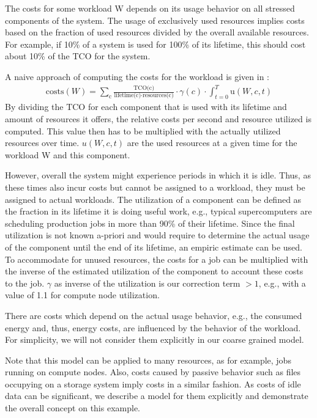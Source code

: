 \documentclass{../../template/esiwace-report}
\begin{document}
The costs for some workload W depends on its usage behavior on all stressed components of the system.
The usage of exclusively used resources implies costs based on the fraction of used resources divided by the overall available resources.
For example, if 10\% of a system is used for 100\% of its lifetime, this should cost about 10\% of the TCO for the system.


A naive approach of computing the costs for the workload is given in :
\begin{align}
\label{eq:distributeCosts}
\mbox{costs}(W) = \sum_{\mbox{c}} \frac{\mbox{TCO(c})}{\mbox{lifetime(c)} \cdot \mbox{resources(c)}} \cdot \gamma(c)  \cdot \int_{t = 0}^{T} {\mbox{u}(W,c,t)}
\end{align}
By dividing the TCO for each component that is used with its lifetime and amount of resources it offers, the relative costs per second and resource utilized is computed.
This value then has to be multiplied with the actually utilized resources over time.
$u(W,c,t)$ are the used resources at a given time for the workload W and this component.

However, overall the system might experience periods in which it is idle.
Thus, as these times also incur costs but cannot be assigned to a workload, they must be assigned to actual workloads.
The utilization of a component can be defined as the fraction in its lifetime it is doing useful work, e.g., typical supercomputers are scheduling production jobs in more than 90\% of their lifetime.
Since the final utilization is not known a-priori and would require to determine the actual usage of the component until the end of its lifetime, an empiric estimate can be used.
To accommodate for unused resources, the costs for a job can be multiplied with the inverse of the estimated utilization of the component to account these costs to the job.
$\gamma$ as inverse of the utilization is our correction term $> 1$, e.g., with a value of 1.1 for compute node utilization.









There are costs which depend on the actual usage behavior, e.g., the consumed energy and, thus, energy costs, are influenced by the behavior of the workload.
For simplicity, we will not consider them explicitly in our coarse grained model.

Note that this model can be applied to many resources, as for example, jobs running on compute nodes.
Also, costs caused by passive behavior such as files occupying on a storage system imply costs in a similar fashion.
As costs of idle data can be significant, we describe a model for them explicitly and demonstrate the overall concept on this example.
\end{document}

